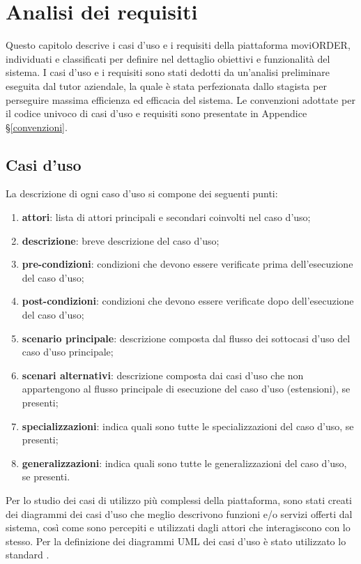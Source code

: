 
\chapter{Analisi dei requisiti}
\label{cap:analisi-requisiti}

Questo capitolo descrive i casi d'uso e i requisiti della piattaforma moviORDER, individuati e classificati per definire nel dettaglio obiettivi e funzionalità del sistema. I casi d'uso e i requisiti sono stati dedotti da un'analisi preliminare eseguita dal tutor aziendale, la quale è stata perfezionata dallo stagista per perseguire massima efficienza ed efficacia del sistema. Le convenzioni adottate per il codice univoco di casi d'uso e requisiti sono presentate in Appendice §\ref{convenzioni}.

\section{Casi d'uso}

La descrizione di ogni caso d'uso si compone dei seguenti punti:
\begin{enumerate}
	\item \textbf{attori}: lista di attori principali e secondari coinvolti nel caso d'uso;
    \item \textbf{descrizione}: breve descrizione del caso d'uso;
    \item \textbf{pre-condizioni}: condizioni che devono essere verificate prima dell'esecuzione del caso d'uso;
    \item \textbf{post-condizioni}: condizioni che devono essere verificate dopo dell'esecuzione del caso d'uso;
    \item \textbf{scenario principale}: descrizione composta dal flusso dei sottocasi d'uso del caso d'uso principale;
    \item \textbf{scenari alternativi}: descrizione composta dai casi d'uso che non appartengono al flusso
    principale di esecuzione del caso d'uso (estensioni), se presenti;
    \item \textbf{specializzazioni}: indica quali sono tutte le specializzazioni del caso d'uso, se presenti;
    \item \textbf{generalizzazioni}: indica quali sono tutte le generalizzazioni del caso d'uso, se presenti.
\end{enumerate}
Per lo studio dei casi di utilizzo più complessi della piattaforma, sono stati creati dei diagrammi dei casi d'uso che meglio descrivono funzioni e/o servizi offerti dal sistema, così come sono percepiti e utilizzati dagli attori che interagiscono con lo stesso. Per la definizione dei diagrammi UML dei casi d'uso è stato utilizzato lo standard . 

